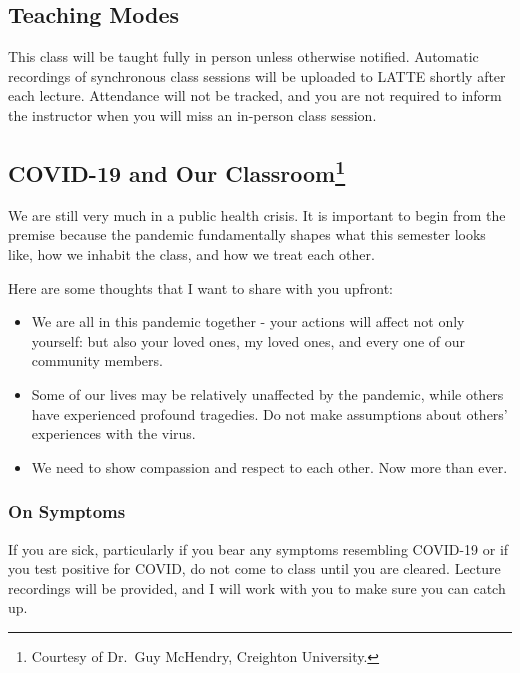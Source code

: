 \documentclass[
]{article}
\providecommand{\tightlist}{%
  \setlength{\itemsep}{0pt}\setlength{\parskip}{0pt}}
\begin{document}
\hypertarget{teaching-modes}{%
\subsection{Teaching Modes}\label{teaching-modes}}

This class will be taught fully in person unless otherwise notified.
Automatic recordings of synchronous class sessions will be uploaded to
LATTE shortly after each lecture. Attendance will not be tracked, and
you are not required to inform the instructor when you will miss an
in-person class session.

\hypertarget{covid-19-and-our-classroom1}{%
\subsection[COVID-19 and Our Classroom]{\texorpdfstring{COVID-19 and Our
Classroom\footnote{Courtesy of Dr.~Guy McHendry, Creighton University.}}{COVID-19 and Our Classroom}}\label{covid-19-and-our-classroom1}}

We are still very much in a public health crisis. It is important to
begin from the premise because the pandemic fundamentally shapes what
this semester looks like, how we inhabit the class, and how we treat
each other.

Here are some thoughts that I want to share with you upfront:

\begin{itemize}
\tightlist
\item
  We are all in this pandemic together - your actions will affect not
  only yourself: but also your loved ones, my loved ones, and every one
  of our community members.
\item
  Some of our lives may be relatively unaffected by the pandemic, while
  others have experienced profound tragedies. Do not make assumptions
  about others' experiences with the virus.
\item
  We need to show compassion and respect to each other. Now more than
  ever.
\end{itemize}

\hypertarget{on-symptoms}{%
\subsubsection{On Symptoms}\label{on-symptoms}}

If you are sick, particularly if you bear any symptoms resembling
COVID-19 or if you test positive for COVID, do not come to class until
you are cleared. Lecture recordings will be provided, and I will work
with you to make sure you can catch up.
\end{document}
